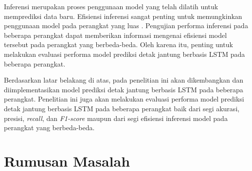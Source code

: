 
Inferensi merupakan proses penggunaan model yang telah dilatih untuk memprediksi data baru. 
Efisiensi inferensi sangat penting untuk memungkinkan penggunaan model pada perangkat yang luas \parencite{ulkerReviewingInferencePerformance2020}. 
Pengujian performa inferensi pada beberapa perangkat dapat memberikan informasi mengenai efisiensi model tersebut pada perangkat yang berbeda-beda.
Oleh karena itu, penting untuk melakukan evaluasi performa model prediksi detak jantung berbasis LSTM pada beberapa perangkat.

Berdasarkan latar belakang di atas, pada penelitian ini akan dikembangkan dan diimplementasikan model prediksi detak jantung berbasis LSTM pada beberapa perangkat.
Penelitian ini juga akan melakukan evaluasi performa model prediksi detak jantung berbasis LSTM pada beberapa perangkat baik dari segi akurasi, presisi, \emph{recall}, dan \emph{F1-score} maupun dari segi efisiensi inferensi model pada perangkat yang berbeda-beda.





\section{Rumusan Masalah}


